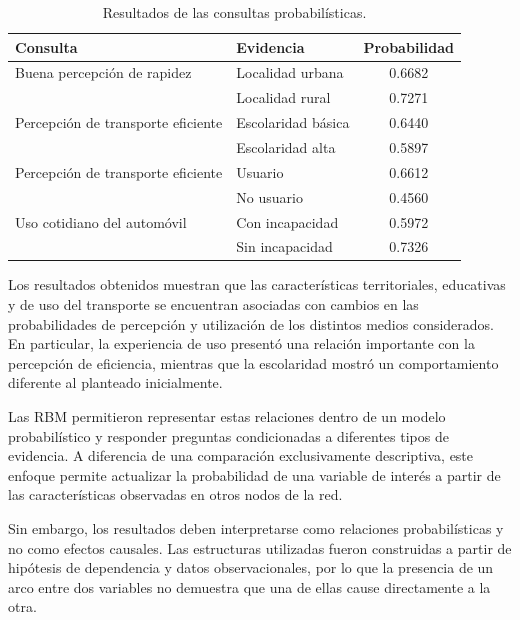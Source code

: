 \documentclass[
  letterpaper,
  DIV=11,
  numbers=noendperiod]{scrartcl}
\begin{document}
\begin{table}[H]
\centering
\caption{Resultados de las consultas probabilísticas.}
\label{tab:queries}
\begin{tabular}{p{6cm}lc}
\toprule
Consulta & Evidencia & Probabilidad \\
\midrule

Buena percepción de rapidez 
& Localidad urbana & 0.6682 \\

& Localidad rural & 0.7271 \\
\midrule

Percepción de transporte eficiente 
& Escolaridad básica & 0.6440 \\

& Escolaridad alta & 0.5897 \\
\midrule

Percepción de transporte eficiente 
& Usuario & 0.6612 \\

& No usuario & 0.4560 \\
\midrule

Uso cotidiano del automóvil 
& Con incapacidad & 0.5972 \\

& Sin incapacidad & 0.7326 \\

\bottomrule
\end{tabular}
\end{table}

Los resultados obtenidos muestran que las características territoriales, educativas 
y de uso del transporte se encuentran asociadas con cambios en las probabilidades 
de percepción y utilización de los distintos medios considerados. En particular, 
la experiencia de uso presentó una relación importante con la percepción de 
eficiencia, mientras que la escolaridad mostró un comportamiento diferente al 
planteado inicialmente.

Las RBM permitieron representar estas relaciones dentro de un modelo 
probabilístico y responder preguntas condicionadas a diferentes tipos de evidencia. 
A diferencia de una comparación exclusivamente descriptiva, este enfoque permite 
actualizar la probabilidad de una variable de interés a partir de las características 
observadas en otros nodos de la red.

Sin embargo, los resultados deben interpretarse como relaciones probabilísticas 
y no como efectos causales. Las estructuras utilizadas fueron construidas a partir 
de hipótesis de dependencia y datos observacionales, por lo que la presencia de un 
arco entre dos variables no demuestra que una de ellas cause directamente a la otra.
\end{document}
